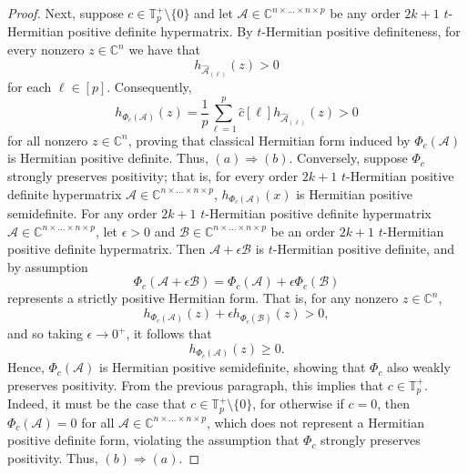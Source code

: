 \documentclass[10pt,a4paper]{amsart}
\begin{document}
\begin{proof}
    Next, suppose $c\in \mathbb{T}_p^+\setminus \{0\}$ and let $\mathcal{A}\in \mathbb{C}^{n\times\dots\times n\times p}$ be any order $2k+1$ $t$-Hermitian positive definite hypermatrix. By $t$-Hermitian positive definiteness, for every nonzero $z\in \mathbb{C}^n$ we have that 
    \[h_{\widehat{\mathcal{A}}_{(\ell)}}(z) > 0\]
    for each $\ell\in [p]$. Consequently, 
    \[h_{\Phi_c(\mathcal{A})}(z) = \frac{1}{p}\sum\limits_{\ell=1}^p\widehat{c}[\ell]h_{\widehat{\mathcal{A}}_{(\ell)}}(z)>0\]
    for all nonzero $z\in \mathbb{C}^n$, proving that classical Hermitian form induced by $\Phi_c(\mathcal{A})$ is Hermitian positive definite. Thus, $(a)\Rightarrow (b)$. Conversely, suppose $\Phi_c$ strongly preserves positivity; that is, for every order $2k+1$ $t$-Hermitian positive definite hypermatrix $\mathcal{A}\in \mathbb{C}^{n\times\dots\times n\times p}$, $h_{\Phi_c(\mathcal{A})}(x)$ is Hermitian positive semidefinite. For any order $2k+1$ $t$-Hermitian positive definite hypermatrix $\mathcal{A}\in \mathbb{C}^{n\times\dots\times n\times p}$, let $\epsilon > 0$ and $\mathcal{B}\in \mathbb{C}^{n\times\dots\times n\times p}$ be an order $2k+1$ $t$-Hermitian positive definite hypermatrix. Then $\mathcal{A}+\epsilon\mathcal{B}$ is $t$-Hermitian positive definite, and by assumption 
    \[\Phi_c(\mathcal{A}+\epsilon\mathcal{B}) = \Phi_c(\mathcal{A})+\epsilon\Phi_c(\mathcal{B})\]
    represents a strictly positive Hermitian form. That is, for any nonzero $z\in \mathbb{C}^n$, 
    \[h_{\Phi_c(\mathcal{A})}(z)+\epsilon h_{\Phi_c(\mathcal{B})}(z) > 0,\]
    and so taking $\epsilon\rightarrow 0^+$, it follows that 
    \[h_{\Phi_c(\mathcal{A})}(z)\geq 0.\]
    Hence, $\Phi_c(\mathcal{A})$ is Hermitian positive semidefinite, showing that $\Phi_c$ also weakly preserves positivity. From the previous paragraph, this implies that $c\in \mathbb{T}_p^+$. Indeed, it must be the case that $c\in \mathbb{T}_p^+\setminus \{0\}$, for otherwise if $c=0$, then $\Phi_c(\mathcal{A})=0$ for all $\mathcal{A}\in \mathbb{C}^{n\times\dots\times n\times p}$, which does not represent a Hermitian positive definite form, violating the assumption that $\Phi_c$ strongly preserves positivity. Thus, $(b)\Rightarrow (a)$. 
\end{proof}
\end{document}
